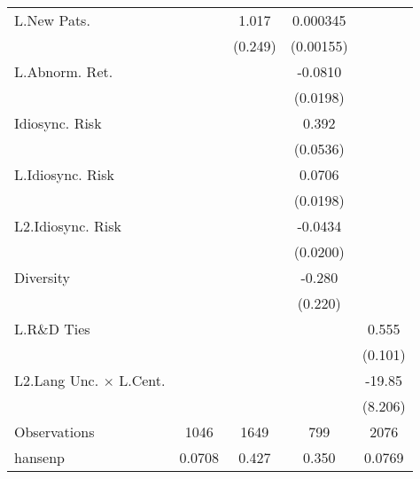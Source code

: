 \begin{table}
\begin{center}
{\begin{tabular}{l*{4}{c}}
L.New Pats.         &                     &       1.017\sym{***}&    0.000345         &                     \\
                    &                     &     (0.249)         &   (0.00155)         &                     \\
L.Abnorm. Ret.      &                     &                     &     -0.0810\sym{***}&                     \\
                    &                     &                     &    (0.0198)         &                     \\
Idiosync. Risk      &                     &                     &       0.392\sym{***}&                     \\
                    &                     &                     &    (0.0536)         &                     \\
L.Idiosync. Risk    &                     &                     &      0.0706\sym{***}&                     \\
                    &                     &                     &    (0.0198)         &                     \\
L2.Idiosync. Risk   &                     &                     &     -0.0434\sym{*}  &                     \\
                    &                     &                     &    (0.0200)         &                     \\
Diversity           &                     &                     &      -0.280         &                     \\
                    &                     &                     &     (0.220)         &                     \\
L.R\&D Ties         &                     &                     &                     &       0.555\sym{***}\\
                    &                     &                     &                     &     (0.101)         \\
L2.Lang Unc. $\times$ L.Cent.&                     &                     &                     &      -19.85\sym{*}  \\
                    &                     &                     &                     &     (8.206)         \\
\hline
Observations        &        1046         &        1649         &         799         &        2076         \\
hansenp             &      0.0708         &       0.427         &       0.350         &      0.0769         \\

\end{tabular}}
\end{center}
\end{table}

